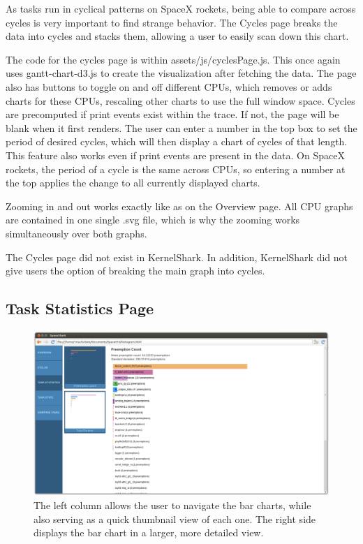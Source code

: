 \documentclass{hmcclinic}
\begin{document}
  As tasks run in cyclical patterns on SpaceX rockets, being able to compare
  across cycles is very important to find strange behavior. The Cycles page
  breaks the data into cycles and stacks them, allowing a user to easily scan
  down this chart.

    The code for the cycles page is within assets/js/cyclesPage.js. This once again
    uses gantt-chart-d3.js to create the visualization after fetching the data.
    The page also has buttons to toggle on and off different CPUs, which removes
    or adds charts for these CPUs, rescaling other charts to use the full window
    space. Cycles are precomputed if print events exist within the trace. If
    not, the page will be blank when it first renders. The user can enter a
    number in the top box to set the period of desired cycles, which will then
    display a chart of cycles of that length. This feature also works even if
    print events are present in the data. On SpaceX rockets, the period of a cycle 
    is the same across CPUs, so entering a number at the top applies the change
    to all currently displayed charts.
    
    Zooming in and out works exactly like as on the Overview page. All CPU graphs are contained in one single .svg file, which is why the zooming works simultaneously over both graphs.
    
    The Cycles page did not exist in KernelShark. In addition, KernelShark did not give users the option of breaking the main graph into cycles.
  
  \subsection{Task Statistics Page} %

  \begin{figure}[H]
  \includegraphics[width=5in]{task-statistics-page.png}
  \caption{The left column allows the user to navigate the bar charts, while
    also serving as a quick thumbnail view of each one. The right side displays
  the bar chart in a larger, more detailed view.}
  \end{figure}
\end{document}
